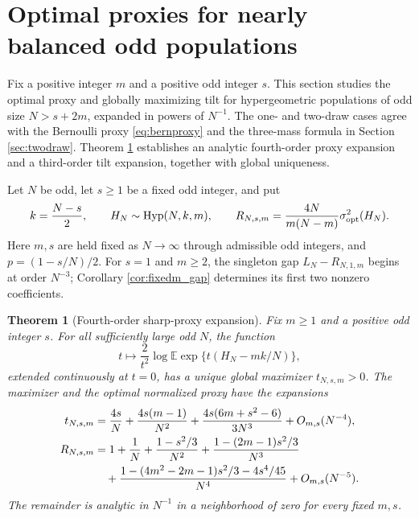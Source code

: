 \documentclass[11pt,a4paper]{article}
\newtheorem{theorem}{Theorem}[section]
\newcommand{\E}{\mathbb E}\newcommand{\R}{\mathbb R}\newcommand{\N}{\mathbb N}\newcommand{\one}{\mathbf1}
\begin{document}
\appendix


\section{Optimal proxies for nearly balanced odd populations}\label{sec:odd_asym}
Fix a positive integer $m$ and a positive odd integer $s$. This section studies the optimal proxy and globally maximizing tilt for hypergeometric populations of odd size $N>s+2m$, expanded in powers of $N^{-1}$. The one- and two-draw cases agree with the Bernoulli proxy \eqref{eq:bernproxy} and the three-mass formula in Section \ref{sec:twodraw}. Theorem \ref{thm:odd_expansion} establishes an analytic fourth-order proxy expansion and a third-order tilt expansion, together with global uniqueness.

Let $N$ be odd, let $s\ge1$ be a fixed odd integer, and put
\begin{equation}\label{eq:oddparams}
 k=\frac{N-s}{2},\qquad H_N\sim\operatorname{Hyp}(N,k,m),\qquad
 R_{N,s,m}=\frac{4N}{m(N-m)}\sigma^2_{\mathrm{opt}}(H_N).
\end{equation}
Here $m,s$ are held fixed as $N\to\infty$ through admissible odd integers, and $p=(1-s/N)/2$. For $s=1$ and $m\ge2$, the singleton gap $L_N-R_{N,1,m}$ begins at order $N^{-3}$; Corollary \ref{cor:fixedm_gap} determines its first two nonzero coefficients.

\begin{theorem}[Fourth-order sharp-proxy expansion]\label{thm:odd_expansion}
Fix $m\ge1$ and a positive odd integer $s$. For all sufficiently large odd $N$, the function
\[
 t\longmapsto\frac{2}{t^2}\log\E\exp\{t(H_N-mk/N)\},
\]
extended continuously at $t=0$, has a unique global maximizer $t_{N,s,m}>0$. The maximizer and the optimal normalized proxy have the expansions
\begin{align}
 t_{N,s,m}&=\frac{4s}{N}+\frac{4s(m-1)}{N^2}
 +\frac{4s(6m+s^2-6)}{3N^3}+O_{m,s}(N^{-4}),\label{eq:tiltexp}\\
 R_{N,s,m}
 &=1+\frac1N+\frac{1-s^2/3}{N^2}
 +\frac{1-(2m-1)s^2/3}{N^3}\notag\\
 &\quad+\frac{1-(4m^2-2m-1)s^2/3-4s^4/45}{N^4}
 +O_{m,s}(N^{-5}).\label{eq:Rexp}
\end{align}
The remainder is analytic in $N^{-1}$ in a neighborhood of zero for every fixed $m,s$.
\end{theorem}
\end{document}
